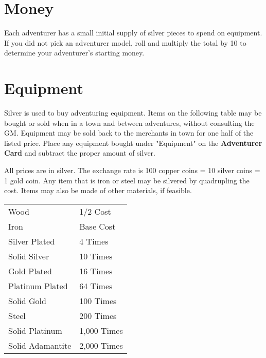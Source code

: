 \begin{multicols*}{2}
\section{Money}
Each adventurer has a small initial supply of silver pieces to spend on equipment. If you did not pick an adventurer model, roll  and multiply the total by 10 to determine your adventurer's starting money.
\section{Equipment}
Silver is used to buy adventuring equipment. Items on the following table may be bought or sold when in a town and between adventures, without consulting the GM. Equipment may be sold back to the merchants in town for one half of the listed price. Place any equipment bought under "Equipment" on the \textbf{Adventurer Card} and subtract the proper amount of silver.

All prices are in silver. The exchange rate is 100 copper coins = 10 silver coins = 1 gold coin. Any item that is iron or steel may be silvered by quadrupling the cost. Items may also be made of other materials, if feasible.

\begin{normbox}
\begin{tabular}{@{}l l}
Wood  & 1/2 Cost\\
Iron  & Base Cost\\
Silver Plated  & 4 Times\\
Solid Silver  & 10 Times\\
Gold Plated  & 16 Times\\
Platinum Plated  & 64 Times\\
Solid Gold  & 100 Times\\
Steel  & 200 Times\\
Solid Platinum  & 1,000 Times\\
Solid Adamantite  & 2,000 Times\\
\end{tabular}
\end{normbox}
\end{multicols*}
\setlength{\columnsep}{0cm}
\begin{multicols*}{4}
\begin{tcbraster}[raster columns=1,boxrule=0pt,title=\textbf{Equipment},left=2pt,right=0pt,top=0pt,bottom=0pt,boxsep=0pt,boxrule=0.6pt,lefttitle=2.5mm,toptitle=1mm,bottomtitle=1mm,colbacktitle=Navy,colback=white]
\end{tcbraster}
\end{multicols*}
